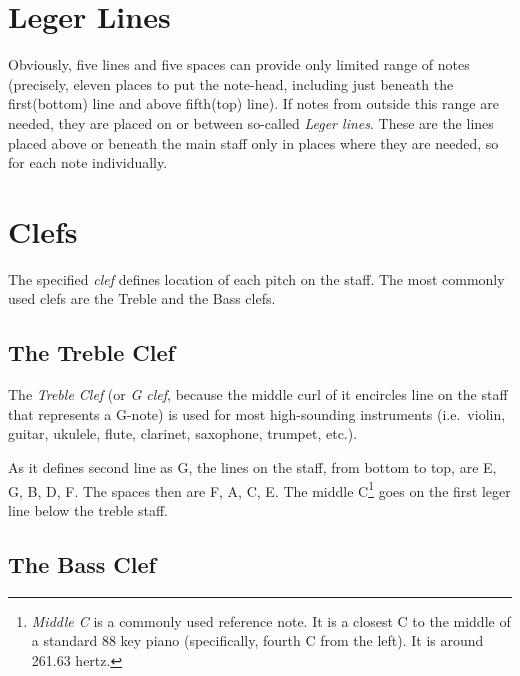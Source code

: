 \figcenter{}


\section{Leger Lines}\label{sec:leger_lines}
Obviously, five lines and five spaces can provide only limited range of notes (precisely, eleven places to put
the note-head, including just beneath the first(bottom) line and above fifth(top) line). If notes from outside this
range are needed, they are placed on or between so-called \textit{Leger lines}. These are the lines placed above or
beneath the main staff only in places where they are needed, so for each note individually.

\figcenter{}

\section{Clefs}\label{sec:clefs}

The specified \textit{clef} defines location of each pitch on the staff. The most commonly used clefs are the Treble and
the Bass clefs\cite{an-explanation-of-clefs}.

\subsection{The Treble Clef}\label{subsec:the-treble-clef}

The \textit{Treble Clef} (or \textit{G clef}, because the middle curl of it encircles line on the staff that represents a
G-note) is used for most high-sounding instruments (i.e.\ violin, guitar, ukulele, flute, clarinet, saxophone, trumpet,
etc.).

\figcenter{}

As it defines second line as G, the lines on the staff, from bottom to top, are E, G, B, D, F. The spaces then
are F, A, C, E\@. The middle C\footnote{\textit{Middle C} is a commonly used reference note. It is a closest C to
the middle of a standard 88 key piano (specifically, fourth C from the left). It is around 261.63 hertz.} goes on
the first leger line below the treble staff.

\subsection{The Bass Clef}\label{subsec:the-bass-clef}

